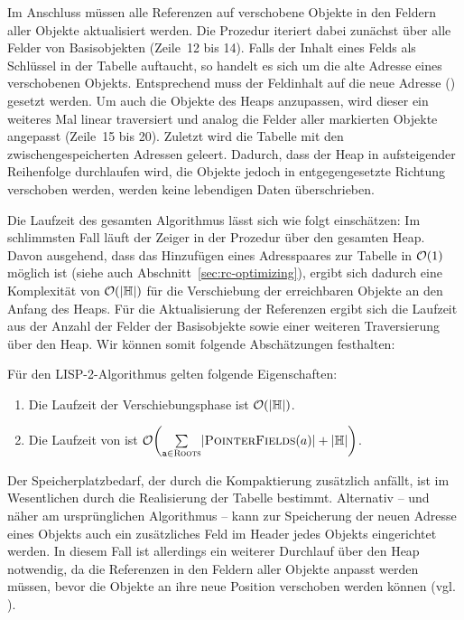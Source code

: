 \newpage

Im Anschluss müssen alle Referenzen auf verschobene Objekte in den Feldern aller Objekte aktualisiert werden.
Die Prozedur  iteriert dabei zunächst über alle Felder von Basisobjekten (Zeile~12 bis 14).
Falls der Inhalt  eines Felds als Schlüssel in der Tabelle auftaucht, so handelt es sich um die alte Adresse eines verschobenen Objekts.
Entsprechend muss der Feldinhalt auf die neue Adresse () gesetzt werden.
Um auch die Objekte des Heaps anzupassen, wird dieser ein weiteres Mal linear traversiert und analog die Felder aller markierten Objekte angepasst (Zeile~15 bis 20).
Zuletzt wird die Tabelle mit den zwischengespeicherten Adressen geleert.
Dadurch, dass der Heap in aufsteigender Reihenfolge durchlaufen wird, die Objekte jedoch in entgegengesetzte Richtung verschoben werden, werden keine lebendigen Daten überschrieben.

Die Laufzeit des gesamten Algorithmus lässt sich wie folgt einschätzen:
Im schlimmsten Fall läuft der Zeiger  in der Prozedur  über den gesamten Heap.
Davon ausgehend, dass das Hinzufügen eines Adresspaares zur Tabelle  in $\mathcal{O}(1)$ möglich ist  (siehe auch Abschnitt~\ref{sec:rc-optimizing}), ergibt sich dadurch eine Komplexität von $\mathcal{O}(\left\lvert\mathbb{H}\right\rvert)$ für die Verschiebung der erreichbaren Objekte an den Anfang des Heaps.
Für die Aktualisierung der Referenzen ergibt sich die Laufzeit aus der Anzahl der Felder der Basisobjekte sowie einer weiteren Traversierung über den Heap.
Wir können somit folgende Abschätzungen festhalten:

\begin{mybox}
\begin{satz}
	Für den LISP-2-Algorithmus gelten folgende Eigenschaften:
	\begin{enumerate}[(1)]
		\item Die Laufzeit der Verschiebungsphase ist $\mathcal{O}(|\mathbb{H}|)$.
		\item Die Laufzeit von  ist $\oh\enb{\sum\limits_{\Var{a} \in \Roots}^{} \abs{\Fields(a)} + \abs{\HeapSize}}$.
	\end{enumerate}
\end{satz}
\end{mybox}

Der Speicherplatzbedarf, der durch die Kompaktierung zusätzlich anfällt, ist im Wesentlichen durch die Realisierung der Tabelle  bestimmt.
Alternativ -- und näher am ursprünglichen Algorithmus -- kann zur Speicherung der neuen Adresse eines Objekts auch ein zusätzliches Feld im Header jedes Objekts eingerichtet werden.
In diesem Fall ist allerdings ein weiterer Durchlauf über den Heap notwendig, da die Referenzen in den Feldern aller Objekte anpasst werden müssen, bevor die Objekte an ihre neue Position verschoben werden können (vgl. \cite[S. 16]{morikawa2013}).

